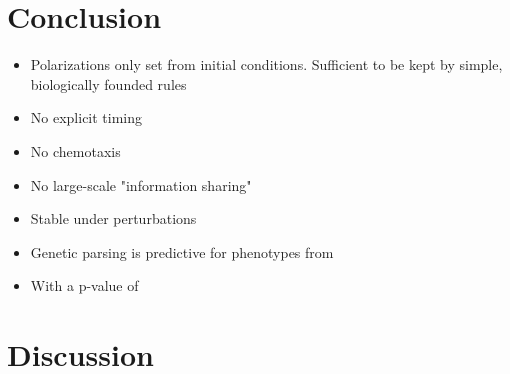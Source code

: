 \section{Conclusion}
\begin{itemize}
    \item Polarizations only set from initial conditions. Sufficient to be kept by simple, biologically founded rules
    \item No explicit timing
    \item No chemotaxis
    \item No large-scale "information sharing"
    \item Stable under perturbations
    \item Genetic parsing is predictive for phenotypes from     
    \item With a p-value of 
\end{itemize}
\section{Discussion}

